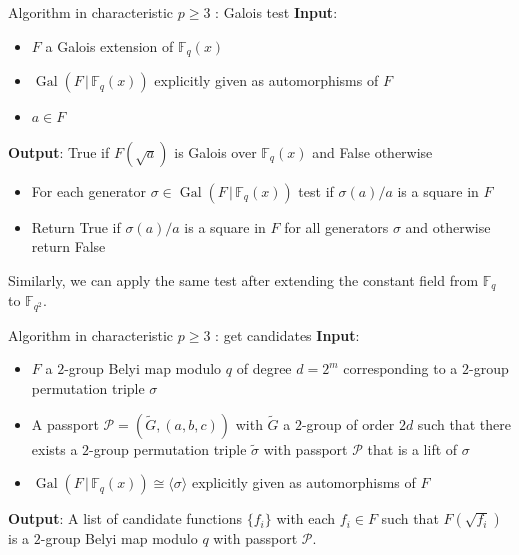 \documentclass[handout,xcolor=dvipsnames]{beamer}
\theoremstyle{plain}
\newcommand{\wt}[1]{\widetilde{#1}}
\newcommand{\FF}{\mathbb{F}}
\DeclareMathOperator{\Gal}{Gal}
\begin{document}
  \begin{frame}{Algorithm in characteristic $p\geq 3$ : Galois test}
    \textbf{Input}:
    \begin{itemize}
      \item
        $F$ a Galois extension of $\FF_q(x)$
      \item
        $\Gal(F\,|\,\FF_q(x))$ explicitly given as automorphisms of $F$
      \item
        $a\in F$
    \end{itemize}
    \textbf{Output}:
    True if $F(\sqrt{a})$ is Galois over $\FF_q(x)$
    and False otherwise
    \par
    \begin{itemize}
      \item
        For each generator $\sigma\in\Gal(F\,|\,\FF_q(x))$
        test if $\sigma(a)/a$ is a square in $F$
      \item
        Return True if $\sigma(a)/a$ is a square in $F$
        for all generators $\sigma$
        and otherwise return False
    \end{itemize}
    \par
    Similarly, we can apply the same test after
    extending the constant field from $\FF_q$
    to $\FF_{q^2}$.
  \end{frame}
  \begin{frame}{Algorithm in characteristic $p\geq 3$ : get candidates}
    \textbf{Input}:
    \begin{itemize}
      \item 
        $F$
        a $2$-group Belyi map modulo $q$
        of degree $d=2^m$
        corresponding to a $2$-group
        permutation triple $\sigma$
      \item
        A passport
        $\mathcal{P}=(\wt{G},(a,b,c))$
        with $\wt{G}$ a $2$-group of order
        $2d$ such that there
        exists a
        $2$-group permutation triple
        $\wt{\sigma}$ with passport
        $\mathcal{P}$
        that is a lift of
        $\sigma$
      \item
        $\Gal(F\,|\,\FF_q(x))\cong
        \langle\sigma\rangle$
        explicitly given
        as automorphisms of $F$
    \end{itemize}
    \textbf{Output}:
    A list of candidate functions
    $\{f_i\}$ with each $f_i\in F$
    such that $F(\sqrt{f_i})$ is a
    $2$-group Belyi map modulo $q$
    with passport $\mathcal{P}$.
  \end{frame}
\end{document}
